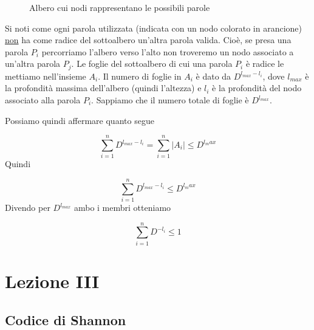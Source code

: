 \documentclass[12pt]{report}
\begin{document}
\begin{dimo}
\begin{figure}
\begin{center}
{{
                    }
                }
            \end{center}
            \caption{Albero cui nodi rappresentano le possibili parole}
        \end{figure}
    \end{dimo}

    Si noti come ogni parola utilizzata (indicata con un nodo colorato in arancione) \underline{non} ha come radice del sottoalbero un'altra parola valida. Cioè, se presa una parola $P_i$ percorriamo l'albero verso l'alto non troveremo un nodo associato a un'altra parola $P_j$.
    Le foglie del sottoalbero di cui una parola $P_i$ è radice le mettiamo nell'insieme $A_i$. Il numero di foglie in $A_i$ è dato da $D^{l_{max} - l_i}$, dove $l_{max}$ è la profondità massima dell'albero (quindi l'altezza) e $l_i$ è la profondità del nodo associato alla parola $P_i$. Sappiamo che il numero totale di foglie è $D^{l_{max}}$.

    Possiamo quindi affermare quanto segue

    $$\sum_{i = 1}^n D^{l_{max} - l_i} = \sum_{i = 1}^n |A_i| \leq D^{l_max}$$
    Quindi

    $$\sum_{i = 1}^n D^{l_{max} - l_i}\leq D^{l_max}$$
    Divendo per $D^{l_{max}}$ ambo i membri otteniamo

    $$\sum_{i = 1}^n D^{-l_i} \leq 1$$

    \chapter{Lezione III}
    \label{cap:Lezione III}

    \section{Codice di Shannon}
\end{document}
